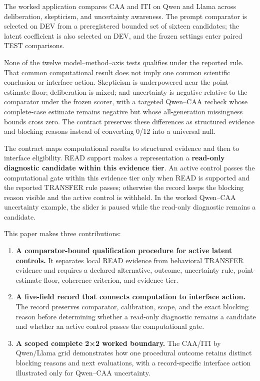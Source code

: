 \documentclass[manuscript,review,anonymous]{acmart}
\providecommand{\tightlist}{%
  \setlength{\itemsep}{0pt}\setlength{\parskip}{0pt}}
\begin{document}
The worked application compares CAA and ITI on Qwen and Llama across deliberation, skepticism, and uncertainty awareness. The prompt comparator is selected on DEV from a preregistered bounded set of sixteen candidates; the latent coefficient is also selected on DEV, and the frozen settings enter paired TEST comparisons. {}%
{}%
{}%

None of the twelve model--method--axis tests qualifies under the reported rule. That common computational result does not imply one common scientific conclusion or interface action. Skepticism is underpowered near the point-estimate floor; deliberation is mixed; and uncertainty is negative relative to the comparator under the frozen scorer, with a targeted Qwen--CAA recheck whose complete-case estimate remains negative but whose all-generation missingness bounds cross zero. {}%
{}%
{}%
{}%
{}%
The contract preserves these differences as structured evidence and blocking reasons instead of converting 0/12 into a universal null.

The contract maps computational results to structured evidence and then to interface eligibility. READ support makes a representation a \textbf{read-only diagnostic candidate within this evidence tier}. An active control passes the computational gate within this evidence tier only when READ is supported and the reported TRANSFER rule passes; otherwise the record keeps the blocking reason visible and the active control is withheld. In the worked Qwen--CAA uncertainty example, the slider is paused while the read-only diagnostic remains a candidate. {}%



This paper makes three contributions:

\begin{enumerate}
\def\labelenumi{\arabic{enumi}.}
\tightlist
\item
  \textbf{A comparator-bound qualification procedure for active latent controls.} It separates local READ evidence from behavioral TRANSFER evidence and requires a declared alternative, outcome, uncertainty rule, point-estimate floor, coherence criterion, and evidence tier.
\item
  \textbf{A five-field record that connects computation to interface action.} The record preserves comparator, calibration, scope, and the exact blocking reason before determining whether a read-only diagnostic remains a candidate and whether an active control passes the computational gate.
\item
  \textbf{A scoped complete 2×2 worked boundary.} The CAA/ITI by Qwen/Llama grid demonstrates how one procedural outcome retains distinct blocking reasons and next evaluations, with a record-specific interface action illustrated only for Qwen--CAA uncertainty.
\end{enumerate}
\end{document}
